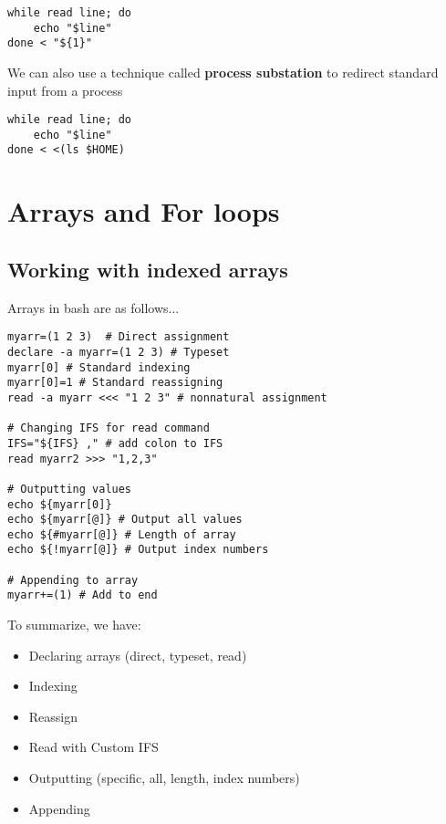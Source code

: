 \documentclass{report}
\begin{document}
    \begin{verbatim}
while read line; do
    echo "$line"
done < "${1}"
    \end{verbatim}
    \bigbreak \noindent
    
    \bigbreak \noindent 
    We can also use a technique called \textbf{process substation} to redirect standard input from a process
    
    \begin{verbatim}
while read line; do
    echo "$line"
done < <(ls $HOME)
    \end{verbatim}
    \bigbreak \noindent
    

    \pagebreak \bigbreak \noindent 
    \section{\LARGE Arrays and For loops}
    \bigbreak \noindent 
    \subsection{Working with indexed arrays}
    Arrays in bash are as follows...
    
    \begin{verbatim}
myarr=(1 2 3)  # Direct assignment
declare -a myarr=(1 2 3) # Typeset
myarr[0] # Standard indexing
myarr[0]=1 # Standard reassigning
read -a myarr <<< "1 2 3" # nonnatural assignment

# Changing IFS for read command
IFS="${IFS} ," # add colon to IFS
read myarr2 >>> "1,2,3"

# Outputting values
echo ${myarr[0]}
echo ${myarr[@]} # Output all values
echo ${#myarr[@]} # Length of array
echo ${!myarr[@]} # Output index numbers

# Appending to array
myarr+=(1) # Add to end
    \end{verbatim}
    \bigbreak \noindent
    
    \bigbreak \noindent 
    To summarize, we have:
    \begin{itemize}
        \item Declaring arrays (direct, typeset, read)
        \item Indexing
        \item Reassign
        \item  Read with Custom IFS
        \item Outputting (specific, all, length, index numbers)
        \item Appending
    \end{itemize}
\end{document}
